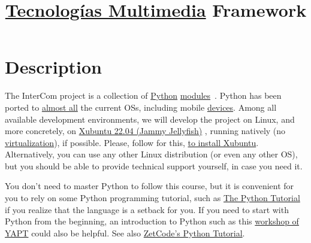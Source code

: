 
\title{\href{https://tecnologias-multimedia.github.io/}{Tecnologías Multimedia} \newline Framework}

\maketitle
\tableofcontents

\section{Description}

The InterCom project \cite{intercom} is a collection of
\href{https://www.python.org/}{Python}
\href{https://docs.python.org/3/tutorial/modules.html#modules}{modules}~\cite{python}.
Python has been ported to
\href{https://www.python.org/download/other/}{almost all} the current
OSs, including mobile \href{https://kivy.org/#home}{devices}. Among
all available development environments, we will develop the project on
Linux, and more concretely, on
\href{https://xubuntu.org/download/}{Xubuntu 22.04 (Jammy Jellyfish)}
\cite{xubuntu}, running natively (no
\href{https://en.wikipedia.org/wiki/Virtualization}{virtualization}),
if possible. Please, follow for this,
\href{https://vicente-gonzalez-ruiz.github.io/Xubuntu_install/}{to
  install Xubuntu}. Alternatively, you can use any other Linux
distribution (or even any other OS), but you should be able to
provide technical support yourself, in case you need it.

You don't need to master Python to follow this course, but it is
convenient for you to rely on some Python programming tutorial, such
as \href{https://docs.python.org/3/tutorial/}{The Python Tutorial}
\cite{python-tutorial} if you realize that the language is a setback
for you. If you need to start with Python from the beginning, an
introduction to Python such as this
\href{https://github.com/vicente-gonzalez-ruiz/YAPT/tree/master/workshops/programacion_python_ESO}{workshop
  of YAPT} \cite{YAPT} could also be helpful. See also
\href{http://zetcode.com/lang/python/}{ZetCode's Python
  Tutorial}.

